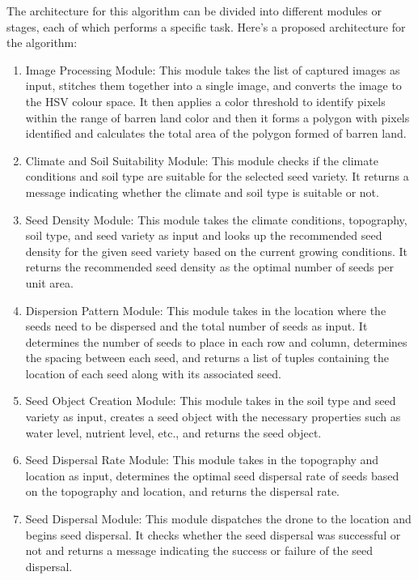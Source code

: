 \documentclass[conference]{IEEEtran}
\begin{document}
The architecture for this algorithm can be divided into different modules or stages, each of which performs a specific task. Here's a proposed architecture for the algorithm:
\begin{enumerate}
\item Image Processing Module: This module takes the list of captured images as input, stitches them together into a single image, and converts the image to the HSV colour space. It then applies a color threshold to identify pixels within the range of barren land color and then it forms a polygon with pixels identified and calculates the total area of the polygon formed of barren land.

\item Climate and Soil Suitability Module: This module checks if the climate conditions and soil type are suitable for the selected seed variety. It returns a message indicating whether the climate and soil type is suitable or not.

\item Seed Density Module: This module takes the climate conditions, topography, soil type, and seed variety as input and looks up the recommended seed density for the given seed variety based on the current growing conditions. It returns the recommended seed density as the optimal number of seeds per unit area.

\item Dispersion Pattern Module: This module takes in the location where the seeds need to be dispersed and the total number of seeds as input. It determines the number of seeds to place in each row and column, determines the spacing between each seed, and returns a list of tuples containing the location of each seed along with its associated seed.

\item Seed Object Creation Module: This module takes in the soil type and seed variety as input, creates a seed object with the necessary properties such as water level, nutrient level, etc., and returns the seed object.

\item Seed Dispersal Rate Module: This module takes in the topography and location as input, determines the optimal seed dispersal rate of seeds based on the topography and location, and returns the dispersal rate.

\item Seed Dispersal Module: This module dispatches the drone to the location and begins seed dispersal. It checks whether the seed dispersal was successful or not and returns a message indicating the success or failure of the seed dispersal.
\end{enumerate}
\end{document}
